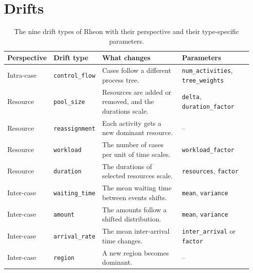 \section{Drifts}
\label{sec:rheon:drifts}
\begin{table}[tbp]
	\centering
	\caption[The nine drift types of Rheon]{%
		The nine drift types of Rheon with their perspective and their type-specific parameters.}
	\label{tab:rheon:drift_types}
	\small
	\begin{tabular}{@{}l>{\raggedright\arraybackslash}p{2.6cm}>{\raggedright\arraybackslash}p{5.6cm}>{\raggedright\arraybackslash}p{3.2cm}@{}}
		\toprule
		Perspective & Drift type             & What changes                                                        & Parameters                                       \\
		\midrule
		Intra-case  & \texttt{control\_flow} & Cases follow a different process tree.                              & \texttt{num\_activities}, \texttt{tree\_weights} \\
		\addlinespace
		Resource    & \texttt{pool\_size}    & Resources are added or removed, and the durations scale.            & \texttt{delta}, \texttt{duration\_factor}        \\
		Resource    & \texttt{reassignment}  & Each activity gets a new dominant resource.                         & --                                               \\
		Resource    & \texttt{workload}      & The number of cases per unit of time scales.                        & \texttt{workload\_factor}                        \\
		Resource    & \texttt{duration}      & The durations of selected resources scale.                          & \texttt{resources}, \texttt{factor}              \\
		\addlinespace
		Inter-case  & \texttt{waiting\_time} & The mean waiting time between events shifts.                        & \texttt{mean}, \texttt{variance}                 \\
		Inter-case  & \texttt{amount}        & The amounts follow a shifted distribution.                          & \texttt{mean}, \texttt{variance}                 \\
		Inter-case  & \texttt{arrival\_rate} & The mean inter-arrival time changes.                                & \texttt{inter\_arrival} or \texttt{factor}       \\
		Inter-case  & \texttt{region}        & A new region becomes dominant.                                      & --                                               \\
		\bottomrule
	\end{tabular}
\end{table}

